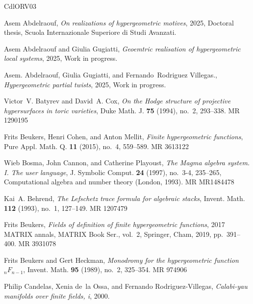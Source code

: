 \documentclass[11pt, reqno]{amsart}
\theoremstyle{plain}
\theoremstyle{definition}
\begin{document}

\newcommand{\etalchar}[1]{$^{#1}$}
\providecommand{\bysame}{\leavevmode\hbox to3em{\hrulefill}\thinspace}
\providecommand{\MR}{\relax\ifhmode\unskip\space\fi MR }
\providecommand{\MRhref}[2]{%
  \href{http://www.ams.org/mathscinet-getitem?mr=#1}{#2}
}
\providecommand{\href}[2]{#2}
\begin{thebibliography}{CdlORV03}

Asem Abdelraouf, \emph{On realizations of hypergeometric motives}, 2025, Doctoral thesis, Scuola Internazionale Superiore di Studi Avanzati.

Asem Abdelraouf and Giulia Gugiatti, \emph{Geoemtric realisation of hypergeometric local systems}, 2025, Work in progress.

Asem. Abdelraouf, Giulia Gugiatti, and Fernando~Rodriguez Villegas., \emph{Hypergeometric partial twists}, 2025, Work in progress.

Victor~V. Batyrev and David~A. Cox, \emph{On the {H}odge structure of projective hypersurfaces in toric varieties}, Duke Math. J. \textbf{75} (1994), no.~2, 293--338. \MR{1290195}

Frits Beukers, Henri Cohen, and Anton Mellit, \emph{Finite hypergeometric functions}, Pure Appl. Math. Q. \textbf{11} (2015), no.~4, 559--589. \MR{3613122}

Wieb Bosma, John Cannon, and Catherine Playoust, \emph{The {M}agma algebra system. {I}. {T}he user language}, J. Symbolic Comput. \textbf{24} (1997), no.~3-4, 235--265, Computational algebra and number theory (London, 1993). \MR{MR1484478}

Kai~A. Behrend, \emph{The {L}efschetz trace formula for algebraic stacks}, Invent. Math. \textbf{112} (1993), no.~1, 127--149. \MR{1207479}

Frits Beukers, \emph{Fields of definition of finite hypergeometric functions}, 2017 {MATRIX} annals, MATRIX Book Ser., vol.~2, Springer, Cham, 2019, pp.~391--400. \MR{3931078}

Frits Beukers and Gert Heckman, \emph{Monodromy for the hypergeometric function {$_nF_{n-1}$}}, Invent. Math. \textbf{95} (1989), no.~2, 325--354. \MR{974906}

Philip Candelas, Xenia de~la Ossa, and Fernando Rodriguez-Villegas, \emph{Calabi-yau manifolds over finite fields, i}, 2000.


\end{thebibliography}
\end{document}
